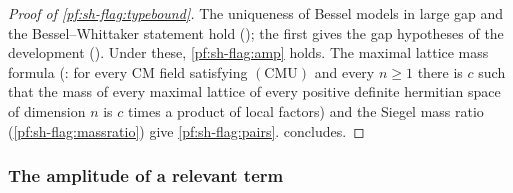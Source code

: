 \begin{proof}[Proof of \cref{pf:sh-flag:typebound}]
The uniqueness of Bessel models in large gap and the Bessel--Whittaker statement hold
(); the first gives the gap hypotheses
of the development (). Under these, \cref{pf:sh-flag:amp} holds. The maximal
lattice mass formula (: for every CM field satisfying $(\mathrm{CMU})$ and
every $n\ge1$ there is $c$ such that the mass of every maximal lattice of every positive definite hermitian space of
dimension $n$ is $c$ times a product of local factors) and the Siegel mass ratio (\cref{pf:sh-flag:massratio}) give
\cref{pf:sh-flag:pairs}.  concludes.
\end{proof}

\subsubsection{The amplitude of a relevant term}

